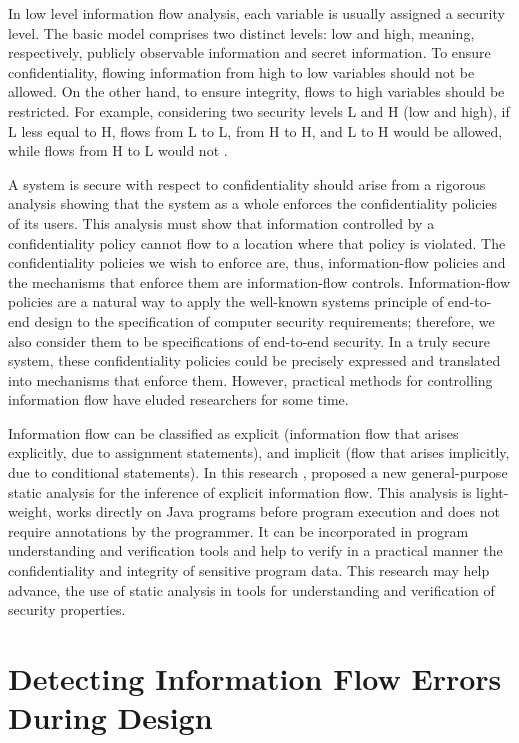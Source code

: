 In low level information flow analysis, each variable is usually assigned a security level. The basic model comprises two distinct levels: low and high, meaning, respectively, publicly observable information and secret information. To ensure confidentiality, flowing information from high to low variables should not be allowed. On the other hand, to ensure integrity, flows to high variables should be restricted. For example, considering two security levels L and H (low and high), if L less equal to H, flows from L to L, from H to H, and L to H would be allowed, while flows from H to L would not \cite{ref_88_smith2007principles}.

A system is secure with respect to confidentiality
should arise from a rigorous analysis showing that the system
as a whole enforces the confidentiality policies of its users.
This analysis must show that information controlled by a confidentiality policy cannot flow to a location where that policy
is violated. The confidentiality policies we wish to enforce
are, thus, information-flow policies and the mechanisms that
enforce them are information-flow controls. Information-flow
policies are a natural way to apply the well-known systems
principle of end-to-end design \cite{ref_89_saltzer1984end} to the specification of
computer security requirements; therefore, we also consider
them to be specifications of end-to-end security. In a truly
secure system, these confidentiality policies could be precisely
expressed and translated into mechanisms that enforce them.
However, practical methods for controlling information flow
have eluded researchers for some time.

Information flow can be classified as explicit (information flow
that arises explicitly, due to assignment statements), and implicit
(flow that arises implicitly, due to conditional statements). In this research \cite{ref_90_liu2008static}, proposed a new general-purpose static analysis for the inference
of explicit information flow. This analysis is light-weight, works directly on Java programs before program execution and
does not require annotations by the programmer. It can be incorporated
in program understanding and verification tools and help to
verify in a practical manner the confidentiality and integrity of sensitive program data. This research may help advance, the use of static analysis in tools for understanding and verification of security properties.


\section{ Detecting Information Flow Errors During Design}

